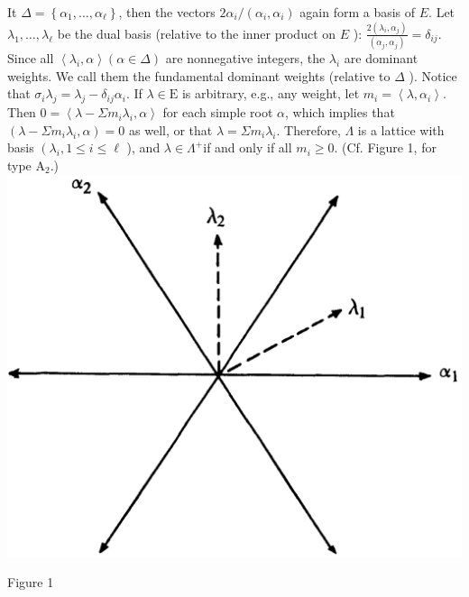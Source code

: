 \documentclass[10pt]{article}
\begin{document}
It $\Delta=\left\{\alpha_{1}, \ldots, \alpha_{\ell}\right\}$, then the vectors $2 \alpha_{i} /\left(\alpha_{i}, \alpha_{i}\right)$ again form a basis of $E$. Let $\lambda_{1}, \ldots, \lambda_{\ell}$ be the dual basis (relative to the inner product on $E$ ): $\frac{2\left(\lambda_{i}, \alpha_{j}\right)}{\left(\alpha_{j}, \alpha_{j}\right)}=\delta_{i j}$. Since all $\left\langle\lambda_{i}, \alpha\right\rangle(\alpha \in \Delta)$ are nonnegative integers, the $\lambda_{i}$ are dominant weights. We call them the fundamental dominant weights (relative to $\Delta$ ). Notice that $\sigma_{i} \lambda_{j}=\lambda_{j}-\delta_{i j} \alpha_{i}$. If $\lambda \in \mathrm{E}$ is arbitrary, e.g., any weight, let $m_{i}=\left\langle\lambda, \alpha_{i}\right\rangle$. Then $0=\left\langle\lambda-\Sigma m_{i} \lambda_{i}, \alpha\right\rangle$ for each simple root $\alpha$, which implies that $\left(\lambda-\Sigma m_{i} \lambda_{i}, \alpha\right)=0$ as well, or that $\lambda=\Sigma m_{i} \lambda_{i}$. Therefore, $\Lambda$ is a lattice with basis $\left(\lambda_{i}, 1 \leq i \leq \ell\right.$ ), and $\lambda \in \Lambda^{+}$if and only if all $m_{i} \geq 0$. (Cf. Figure 1, for type $\mathrm{A}_{2}$.)\\
\includegraphics[max width=\textwidth, center]{2025_06_06_fac2836a92464059da43g-081}

Figure 1
\end{document}
